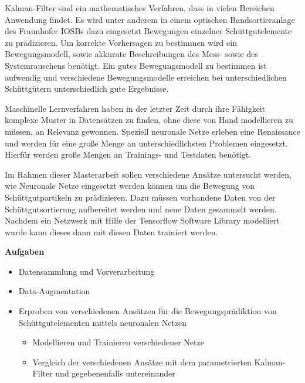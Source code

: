 \documentclass [a4paper, 10pt]{scrartcl}
\begin{document}
\Anfang
Kalman-Filter sind ein mathematisches Verfahren, dass in vielen Bereichen Anwendung findet. 
Es wird unter anderem in einem optischen Bandsortieranlage des Fraunhofer IOSBs dazu eingesetzt Bewegungen einzelner Schüttgutelemente zu prädizieren.
Um korrekte Vorhersagen zu bestimmen wird ein Bewegungsmodell, sowie akkurate Beschreibungen des Mess- sowie des Systemrauschens benötigt.
Ein gutes Bewegungsmodell zu bestimmen ist aufwendig und verschiedene Bewegungsmodelle erreichen bei unterschiedlichen Schüttgütern unterschiedlich gute Ergebnisse.


Maschinelle Lernverfahren haben in der letzter Zeit durch ihre Fähigkeit 
komplexe Muster in Datensätzen zu finden, ohne diese von Hand modellieren zu müssen, an Relevanz gewonnen.
Speziell neuronale Netze erleben eine Renaissance und werden für eine große Menge an unterschiedlichsten Problemen eingesetzt.
Hierfür werden große Mengen an Trainings- und Testdaten benötigt. 

Im Rahmen dieser Masterarbeit sollen verschiedene Ansätze untersucht werden, wie Neuronale Netze eingesetzt werden können um die Bewegung von Schüttgutpartikeln zu prädizieren.
Dazu müssen vorhandene Daten von der Schüttgutsortierung aufbereitet werden und neue Daten gesammelt werden.
Nachdem ein Netzwerk mit Hilfe der Tensorflow Software Library modelliert wurde kann dieses dann mit diesen Daten trainiert werden.





\textbf{Aufgaben}
\begin{itemize}
  \item Datensammlung und Vorverarbeitung
  \item Data-Augmentation
  \item Erproben von verschiedenen Ansätzen für die Bewegungsprädiktion von Schüttgutelementen mittels neuronalen Netzen
  	\begin{itemize}
  		\item Modellieren und Trainieren verschiedener Netze
  		\item Vergleich der verschiedenen Ansätze mit dem parametrierten Kalman-Filter und gegebenenfalls untereinander
  	\end{itemize}
\end{itemize}
\Ende
\end{document}
